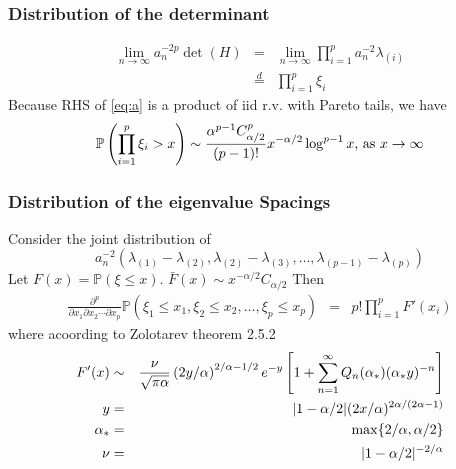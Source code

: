 \documentclass{beamer}
\renewcommand{\P}{
\mathbb P
}
\begin{document}
\begin{frame}
  \frametitle{Distribution of the determinant}
  \begin{eqnarray*}
    \lim_{n \to \infty} a_n^{-2p} \det(H) &=& \lim_{n \to \infty}
    \prod_{i=1}^p a_n^{-2} \lambda_{(i)} \nonumber \\
    &\overset{d}{=}& \prod_{i=1}^p \xi_{i} \label{eq:a}
  \end{eqnarray*}
  Because RHS of \eqref{eq:a} is a product of iid r.v. with Pareto
  tails, we have
  \[
  \P\left(
    \prod_{i=1}^p \xi_{i} > x
  \right) \sim {\alpha^{p-1} C_{\alpha/2}^p \over (p-1)!}  x^{-\alpha/2} \log^{p-1} x 
  \text{, as } x \to \infty
  \]
\end{frame}

\begin{frame}
  \frametitle{Distribution of the eigenvalue Spacings}
  Consider the joint distribution of
  \[
  a_n^{-2}(\lambda_{(1)} - \lambda_{(2)}, \lambda_{(2)} - \lambda_{(3)},
  \dots, \lambda_{(p-1)} - \lambda_{(p)})
  \]
  Let $F(x) = \P(\xi \leq x)$. $\bar{F}(x) \sim x^{-\alpha/2}
  C_{\alpha/2}$
Then
\begin{eqnarray*}
\frac{\partial^p}{\partial x_1\partial x_2 \cdots \partial x_p}
\P(\xi_1 \leq x_1, \xi_2 \leq x_2, \dots, \xi_p \leq x_p)
&=& p! \prod_{i=1}^p F'(x_i)
\end{eqnarray*}
where acoording to Zolotarev \cite{Zolotarev1983} theorem 2.5.2
\begin{eqnarray*}
  F'(x) &\sim& {\nu \over \sqrt{\pi \alpha}} \left(2y/\alpha\right)^{2/\alpha - 1/2}
  e^{-y} \left[
    1 + \sum_{n=1}^\infty Q_n(\alpha_*) (\alpha_* y)^{-n}
  \right] \\
  y &=& |1 - \alpha/2|(2x/\alpha)^{2\alpha/(2\alpha-1)}\\
  \alpha_* &=& \max\{2/\alpha, \alpha/2\} \\
  \nu &=& |1 - \alpha/2|^{-2/\alpha}
\end{eqnarray*}
\end{frame}

  
\end{document}
